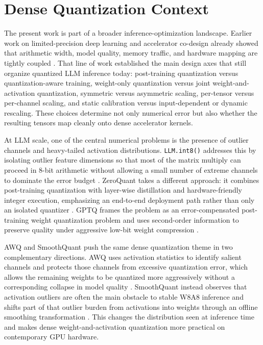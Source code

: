 \section{Dense Quantization Context}
The present work is part of a broader inference-optimization landscape. Earlier work on limited-precision deep learning and accelerator co-design already showed that arithmetic width, model quality, memory traffic, and hardware mapping are tightly coupled \cite{gupta2015limitedprecision,lee2018unpu,mishra2020survey}. That line of work established the main design axes that still organize quantized LLM inference today: post-training quantization versus quantization-aware training, weight-only quantization versus joint weight-and-activation quantization, symmetric versus asymmetric scaling, per-tensor versus per-channel scaling, and static calibration versus input-dependent or dynamic rescaling. These choices determine not only numerical error but also whether the resulting tensors map cleanly onto dense accelerator kernels.

At LLM scale, one of the central numerical problems is the presence of outlier channels and heavy-tailed activation distributions. \texttt{LLM.int8()} addresses this by isolating outlier feature dimensions so that most of the matrix multiply can proceed in 8-bit arithmetic without allowing a small number of extreme channels to dominate the error budget \cite{llmint8}. ZeroQuant takes a different approach: it combines post-training quantization with layer-wise distillation and hardware-friendly integer execution, emphasizing an end-to-end deployment path rather than only an isolated quantizer \cite{zeroquant}. GPTQ frames the problem as an error-compensated post-training weight quantization problem and uses second-order information to preserve quality under aggressive low-bit weight compression \cite{gptq}.

AWQ and SmoothQuant push the same dense quantization theme in two complementary directions. AWQ uses activation statistics to identify salient channels and protects those channels from excessive quantization error, which allows the remaining weights to be quantized more aggressively without a corresponding collapse in model quality \cite{awq}. SmoothQuant instead observes that activation outliers are often the main obstacle to stable W8A8 inference and shifts part of that outlier burden from activations into weights through an offline smoothing transformation \cite{smoothquant}. This changes the distribution seen at inference time and makes dense weight-and-activation quantization more practical on contemporary GPU hardware.

